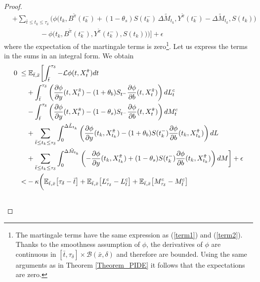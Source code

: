 \begin{proof}
\begin{align}
    & + \sum_{\bar t \leq t_k \leq \tau_{\delta}} \biggl( \phi \bigl( t_k, B^{\tilde \pi}(t_k^-) + (1-\theta_s) S(t_k^-)\, \Delta \tilde M_{t_k}, Y^{\tilde \pi}(t_k^-) 
      - \Delta \tilde M_{t_k}, S(t_k) \bigr) \\ \nonumber
    & \hspace{4em} - \phi \bigl(t_k, B^{\tilde \pi}(t_k^-), Y^{\tilde \pi}(t_k^-), S(t_k) \bigr) \biggr) \biggr] + \epsilon
\end{align}
where the expectation of the martingale terms is zero\footnote{
The martingale terms have the same expression as (\ref{term1}) and (\ref{term2}). 
Thanks to the smoothness assumption of $\phi$, the derivatives of $\phi$ are continuous in $[\bar t, \tau_{\delta}] \times \mathcal{B}(\bar x, \delta)$ and therefore are bounded.
Using the same arguments as in Theorem \ref{Theorem_PIDE} it follows that the expectations are zero. }. 
Let us express the terms in the sums in an integral form. We obtain
\begin{align}\label{second_inequality}
 0 \; \leq & \; \E_{\bar t, \bar x} \biggl[ \int_{\bar t}^{\tau_{\delta}} -\LL \phi(t,X^{\tilde \pi}_t) dt \\ \nonumber
    & + \int_{\bar t}^{\tau_{\delta}} \left(\frac{\partial \phi}{\partial y}(t, X^{\tilde \pi}_t) -(1+\theta_b) S_{t^-} \frac{\partial \phi}{\partial b}( t, X^{\tilde \pi}_t)\right) dL^c_t \\ \nonumber
    & - \int_{\bar t}^{\tau_{\delta}} \left(\frac{\partial \phi}{\partial y}( t, X^{\tilde \pi}_t)-(1-\theta_s) S_{t^-} \frac{\partial \phi}{\partial b}( t, X^{\tilde \pi}_t)\right) dM^c_t \\ \nonumber
    & + \sum_{\bar t \leq t_k \leq \tau_{\delta}} \int_{0}^{\Delta \tilde L_{t_k}} \left(\frac{\partial \phi}{\partial y}(t_k, X^{\tilde \pi}_{t_k}) -(1+\theta_b) S(t_k^-) 
                  \frac{\partial \phi}{\partial b}( t_k, X^{\tilde \pi}_{t_k})\right) dL \\ \nonumber 
    & + \sum_{\bar t \leq t_k \leq \tau_{\delta}} \int_{0}^{\Delta \tilde M_{t_k}} \left(-\frac{\partial \phi}{\partial y}( t_k, X^{\tilde \pi}_{t_k})+(1-\theta_s) S(t_k^-) 
      \frac{\partial \phi}{\partial b}( t_k, X^{\tilde \pi}_{t_k})\right) dM \biggr] + \epsilon \\ \nonumber
  < & -\kappa \biggl( \E_{\bar t, \bar x} \bigl[ \tau_{\delta} - \bar t \bigr] + \E_{\bar t, \bar x} \bigl[ L^c_{\tau_{\delta}} - L^c_{\bar t} \bigr]  
    + \E_{\bar t, \bar x} \bigl[ M^c_{\tau_{\delta}}-M^c_{\bar t} \bigr] \\ \nonumber 

\end{align}
\end{proof}
